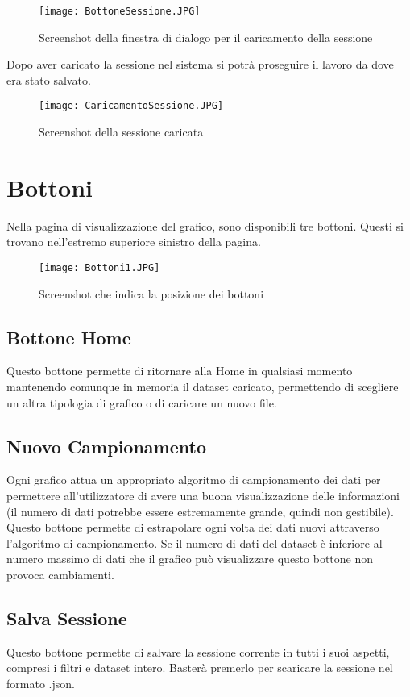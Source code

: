\begin{figure}[H]
    \texttt{[image: BottoneSessione.JPG]}
    \caption{Screenshot della finestra di dialogo per il caricamento della sessione}
\end{figure}

Dopo aver caricato la sessione nel sistema si potrà proseguire il lavoro da dove era stato salvato.

\begin{figure}[H]
    \texttt{[image: CaricamentoSessione.JPG]}
    \caption{Screenshot della sessione caricata}
\end{figure}

\section{Bottoni}
Nella pagina di visualizzazione del grafico, sono disponibili tre bottoni. Questi si trovano nell'estremo superiore sinistro della pagina.

\begin{figure}[H]
    \texttt{[image: Bottoni1.JPG]}
    \caption{Screenshot che indica la posizione dei bottoni}
\end{figure}

\subsection{Bottone Home}
Questo bottone permette di ritornare alla Home in qualsiasi momento mantenendo comunque in memoria il dataset caricato, permettendo di scegliere un altra tipologia di grafico o di caricare un nuovo file.

\subsection{Nuovo Campionamento}
Ogni grafico attua un appropriato algoritmo di campionamento dei dati per permettere all'utilizzatore di avere una buona visualizzazione delle informazioni (il numero di dati potrebbe essere estremamente grande, quindi non gestibile).
Questo bottone permette di estrapolare ogni volta dei dati nuovi attraverso l'algoritmo di campionamento. Se il numero di dati del dataset è inferiore al numero massimo di dati che il grafico può visualizzare questo bottone non provoca cambiamenti.

\subsection{Salva Sessione}
Questo bottone permette di salvare la sessione corrente in tutti i suoi aspetti, compresi i filtri e dataset intero. Basterà premerlo per scaricare la sessione nel formato .json.

